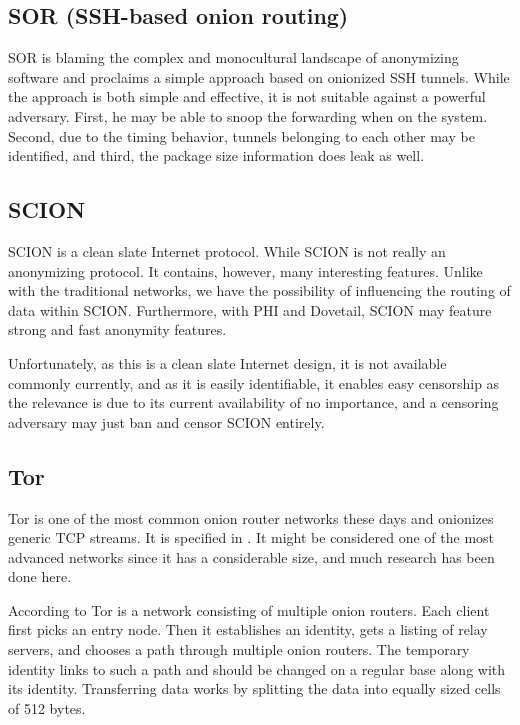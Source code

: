 \subsection{SOR (SSH-based onion routing)}
SOR \cite{Egners_2012} is blaming the complex and monocultural landscape of anonymizing software and proclaims a simple approach based on onionized SSH tunnels. While the approach is both simple and effective, it is not suitable against a powerful adversary. First, he may be able to snoop the forwarding when on the system. Second, due to the timing behavior, tunnels belonging to each other may be identified, and third, the package size information does leak as well.

\subsection{SCION}
SCION\cite{perrig2017scion} is a clean slate Internet protocol. While SCION is not really an anonymizing protocol. It contains, however,  many interesting features. Unlike with the traditional networks, we have the possibility of influencing the routing of data within SCION. Furthermore, with PHI\cite{chen2017phi} and Dovetail\cite{sankey2014dovetail}, SCION may feature strong and fast anonymity features. 

Unfortunately, as this is a clean slate Internet design, it is not available commonly currently, and as it is easily identifiable, it enables easy censorship as the relevance is due to its current availability of no importance, and a censoring adversary may just ban and censor SCION entirely. 

\subsection{Tor\label{sec:tor}}
Tor is one of the most common onion router networks these days and onionizes generic TCP streams. It is specified in \cite{tor-spec}. It might be considered one of the most advanced networks since it has a considerable size, and much research has been done here.

According to \cite{onion-routing:pet2000} Tor is a network consisting of multiple onion routers. Each client first picks an entry node. Then it establishes an identity, gets a listing of relay servers, and chooses a path through multiple onion routers. The temporary identity links to such a path and should be changed on a regular base along with its identity. Transferring data works by splitting the data into equally sized cells of 512 bytes.

